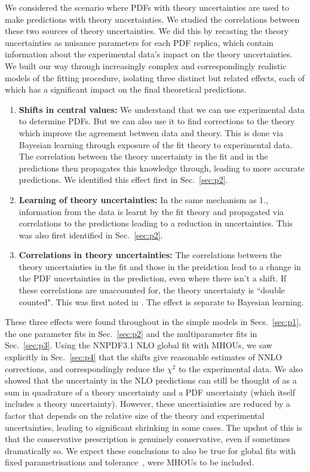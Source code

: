We considered the scenario where PDFs with theory uncertainties are used to make predictions with theory uncertainties. We studied the correlations between these two sources of theory uncertainties. We did this by recasting the theory uncertainties as nuisance parameters for each PDF replica, which contain information about the experimental data's impact on the theory uncertainties. We built our way through increasingly complex and correspondingly realistic models of the fitting procedure, isolating three distinct but related effects, each of which has a significant impact on the final theoretical predictions.

\begin{enumerate}
\item {\bf Shifts in central values: } We understand that we can use experimental data to determine PDFs. But we can also use it to find corrections to the theory which improve the agreement between data and theory. This is done via Bayesian learning through exposure of the fit theory to experimental data. The correlation between the theory uncertainty in the fit and in the predictions then propagates this knowledge through, leading to more accurate predictions. We identified this effect first in Sec.~\ref{sec:p2}.
\item {\bf Learning of theory uncertainties: } In the same mechanism as 1., information from the data is learnt by the fit theory and propagated via correlations to the predictions leading to a reduction in uncertainties. This was also first identified in Sec.~\ref{sec:p2}.
\item {\bf Correlations in theory uncertainties: }The correlations between the theory uncertainties in the fit and those in the preidction lead to a change in the PDF uncertainties in the prediction, even where there isn't a shift. If these correlations are unaccounted for, the theory uncertainty is ``double counted". This was first noted in \cite{Harland-Lang:2018bxd}. The effect is separate to Bayesian learning.
\end{enumerate}

These three effects were found throughout in the simple models in Secs.~\ref{sec:p1}, the one parameter fits in Sec.~\ref{sec:p2} and the multiparameter fits in Sec.~\ref{sec:p3}. Using the NNPDF3.1 NLO global fit with MHOUs, we saw explicitly in Sec.~\ref{sec:p4} that the shifts give reasonable estimates of NNLO corrections, and correspondingly reduce the $\chi^2$ to the experimental data. We also showed that the uncertainty in the NLO predictions can still be thought of as a sum in quadrature of a theory uncertainty and a PDF uncertainty (which itself includes a theory uncertainty). However, these uncertiainties are reduced by a factor that depends on the relative size of the theory and experimental uncertainties, leading to significant shrinking in some cases. The upshot of this is that the conservative prescription is genuinely conservative, even if sometimes dramatically so. We expect these conclusions to also be true for global fits with fixed parametrisations and tolerance~\cite{Bailey:2020ooq,Hou:2019efy}, were MHOUs to be included. 

